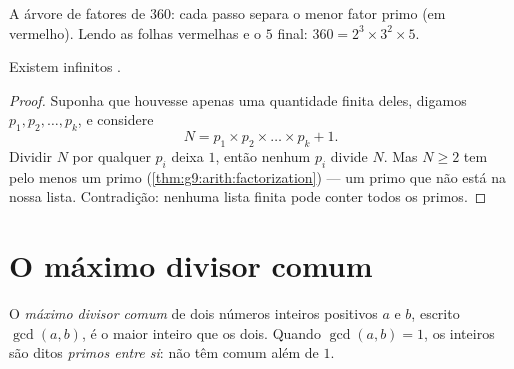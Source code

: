 \begin{omfigure}

{\small A árvore de fatores de $360$: cada passo separa o menor fator
primo (em vermelho). Lendo as folhas vermelhas e o $5$ final:
$360 = 2^3 \times 3^2 \times 5$.}
\end{omfigure}

\begin{theorem}[Euclides]\label{thm:g9:arith:euclid}
Existem infinitos .
\end{theorem}

\begin{proof}
Suponha que houvesse apenas uma quantidade finita deles, digamos
$p_1, p_2, \dots, p_k$, e considere
\[
N = p_1 \times p_2 \times \dots \times p_k + 1 .
\]
Dividir $N$ por qualquer $p_i$ deixa  $1$, então nenhum $p_i$
divide $N$. Mas $N \geq 2$ tem pelo menos um  primo
(\cref{thm:g9:arith:factorization}) --- um primo que não está na nossa
lista. Contradição: nenhuma lista finita pode conter todos os primos.
\end{proof}

\section{O máximo divisor comum}

\begin{definition}[MDC]\label{def:g9:arith:gcd}
O \emph{máximo divisor comum} de dois
números inteiros positivos $a$ e $b$, escrito $\gcd(a, b)$, é o maior
inteiro que  os dois. Quando $\gcd(a, b) = 1$, os inteiros são
ditos \emph{primos entre si}: não têm 
comum além de $1$.
\end{definition}

